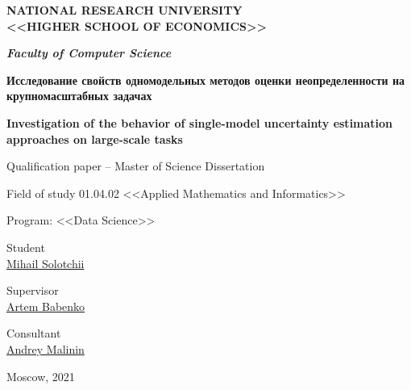 \documentclass{article}
\begin{document}

\begin{titlepage}
\begin{center}

    \large

	{\bfseries NATIONAL RESEARCH UNIVERSITY \\ <<HIGHER SCHOOL OF ECONOMICS>>}

	{\bf\textit{Faculty of Computer Science}}

	\bigskip
	\bigskip


	\bigskip
	\bigskip

    \textbf{Исследование свойств одномодельных методов оценки неопределенности на крупномасштабных задачах}

    \bigskip
    \bigskip

	{\bfseries Investigation of the behavior of single-model uncertainty estimation approaches on large-scale tasks}

    \bigskip
    \bigskip

    Qualification paper – Master of Science Dissertation 

    Field of study 01.04.02 <<Applied Mathematics and Informatics>>

    Program: <<Data Science>>

    \bigskip
    \bigskip

    \begin{flushleft}
        Student \\
        \underline{Mihail Solotchii } \\
    \end{flushleft}

    \begin{flushright}
        Supervisor \\
        \underline{ Artem Babenko} \\
    \end{flushright}

    \bigskip
    \bigskip

    \begin{flushright}
        Consultant \\ %
        \underline{ Andrey Malinin} \\
    \end{flushright}

    \bigskip
    \bigskip

	\vspace{\fill}
	Moscow, 2021
\end{center}
\end{titlepage}
\end{document}
